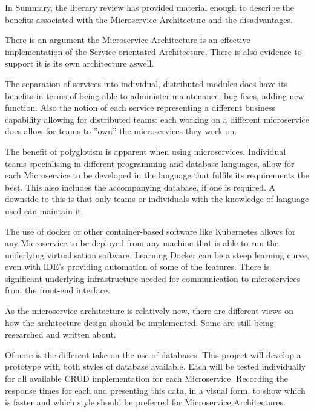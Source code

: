 In Summary, the literary review has provided material enough to describe the benefits associated with the Microservice Architecture and the disadvantages.

There is an argument the Microservice Architecture is an effective implementation of the Service-orientated Architecture. There is also evidence to support it is its own architecture aswell.

The separation of services into individual, distributed modules does have its benefits in terms of being able to administer maintenance: bug fixes, adding new function. Also the notion of each service representing a different business capability allowing for distributed teams: each working on a different microservice does allow for teams to ''own'' the microservices they work on. 

The benefit of polyglotism is apparent when using microservices. Individual teams specialising in different programming and database languages, allow for each Microservice to be developed in the language that fulfils its requirements the best. This also includes the accompanying database, if one is required. A downside to this is that only teams or individuals with the knowledge of language used can maintain it.

The use of docker or other container-based software like Kubernetes allows for any Microservice to be deployed from any machine that is able to run the underlying virtualisation software. Learning Docker can be a steep learning curve, even with IDE's providing automation of some of the features. There is significant underlying infrastructure needed for communication to microservices from the front-end interface.

As the microservice architecture is relatively new, there are different views on how the architecture design should be implemented. Some are still being researched and written about.

Of note is the different take on the use of databases. This project will develop a prototype with both styles of database available. Each will be tested individually for all available CRUD implementation for each Microservice. Recording the response times for each and presenting this data, in a visual form, to show which is faster and which style should be preferred for Microservice Architectures.

